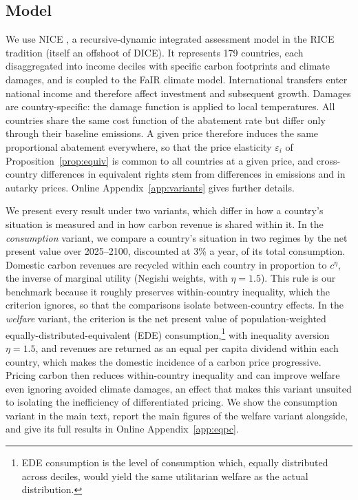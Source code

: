 \documentclass[12pt,english]{article}
\theoremstyle{remark}
\begin{document}
\subsection{Model}

We use NICE \citep{young-brun_within-country_2025}, a recursive-dynamic integrated assessment model in the RICE tradition (itself an offshoot of DICE). It represents 179 countries, each disaggregated into income deciles with specific carbon footprints and climate damages, and is coupled to the FaIR climate model.
International transfers enter national income and therefore affect investment and subsequent growth.
Damages are country-specific: the damage function is applied to local temperatures.
All countries share the same cost function of the abatement rate
but differ only through their baseline emissions.
A given price therefore induces the same proportional abatement everywhere, so that the price elasticity $\varepsilon_i$ of Proposition~\ref{prop:equiv} is common to all countries at a given price, and cross-country differences in equivalent rights stem from differences in emissions and in autarky prices. Online Appendix~\ref{app:variants} gives further details.%

We present every result under two variants, which differ in how a country's situation is measured and in how carbon revenue is shared within it.
In the \emph{consumption} variant, we compare a country's situation in two regimes by the net present value over 2025--2100, discounted at 3\% a year, of its total consumption.
Domestic carbon revenues are recycled within each country in proportion to $c^{\eta}$, the inverse of marginal utility (Negishi weights, with $\eta=1.5$). This rule is our benchmark because it roughly preserves within-country inequality, which the criterion ignores, so that the comparisons isolate between-country effects.
In the \emph{welfare} variant, the criterion is the net present value of population-weighted equally-distributed-equivalent (EDE) consumption,\footnote{EDE consumption is the level of consumption which, equally distributed across deciles, would yield the same utilitarian welfare as the actual distribution.} with inequality aversion $\eta=1.5$, and revenues are returned as an equal per capita dividend within each country, which makes the domestic incidence of a carbon price progressive. Pricing carbon then reduces within-country inequality and can improve welfare even ignoring avoided climate damages, an effect that makes this variant unsuited to isolating the inefficiency of differentiated pricing.
We show the consumption variant in the main text, report the main figures of the welfare variant alongside, and give its full results in Online Appendix~\ref{app:eqpc}.
\end{document}
